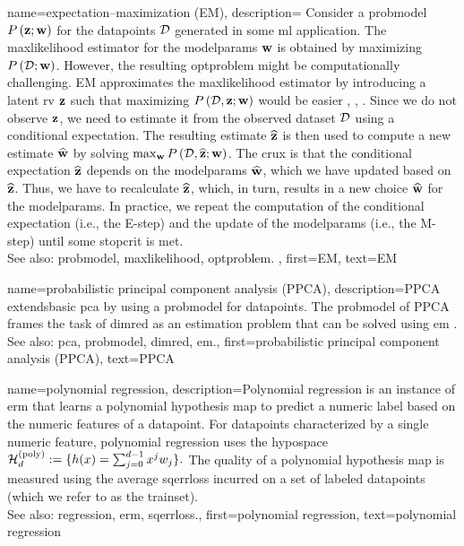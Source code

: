 {name={expectation–maximization (EM)}, 
	description={ 
		Consider a \gls{probmodel} $P\left({\bf z}; {\bf w}\right)$ for the \glspl{datapoint} $\mathcal{D}$ generated in some 
		\gls{ml} application. The \gls{maxlikelihood} estimator for the \gls{modelparams} ${\bf w}$ is obtained by maximizing 
		$P\left(\mathcal{D}; {\bf w}\right)$. However, the resulting \gls{optproblem} might be computationally 
		challenging. EM approximates the \gls{maxlikelihood} estimator by introducing a latent 
		\gls{rv} ${\bf z}$ such that maximizing $P\left(\mathcal{D},{\bf z}; {\bf w}\right)$ would be easier 
		\cite{hastie01statisticallearning}, \cite{BishopBook}, \cite{GraphModExpFamVarInfWainJor}. Since we 
		do not observe ${\bf z}$, we need to estimate it from the observed \gls{dataset} $\mathcal{D}$ 
		using a conditional \gls{expectation}. The resulting estimate $\widehat{{\bf z}}$ is then used to 
		compute a new estimate $\widehat{{\bf w}}$ by solving $\max_{{\bf w}} P\left(\mathcal{D}, \widehat{{\bf z}}; {\bf w}\right)$. 
		The crux is that the conditional \gls{expectation} $\widehat{{\bf z}}$ depends on the \gls{modelparams} $\widehat{{\bf w}}$, 
		which we have updated based on $\widehat{{\bf z}}$. Thus, we have to recalculate $\widehat{{\bf z}}$, 
		which, in turn, results in a new choice $\widehat{{\bf w}}$ for the \gls{modelparams}. In practice, 
		we repeat the computation of the conditional \gls{expectation} (i.e., the E-step) and the update 
		of the \gls{modelparams} (i.e., the M-step) until some \gls{stopcrit} is met. 
				\\
		See also: \gls{probmodel}, \gls{maxlikelihood}, \gls{optproblem}. },
	first={EM},
	text={EM}
}


{name={probabilistic principal component analysis (PPCA)}, 
	description={PPCA 
		extends\linebreak basic \gls{pca} by using a \gls{probmodel} for \glspl{datapoint}. 
		The \gls{probmodel} of PPCA frames the task of \gls{dimred} 
		as an estimation problem that can be solved using \gls{em} \cite{TippingProbPCA}.
				\\
		See also: \gls{pca}, \gls{probmodel}, \gls{dimred}, \gls{em}.},
	first={probabilistic principal component analysis (PPCA)},
	text={PPCA}
}
	
{name={polynomial regression}, 
	description={Polynomial 
		\gls{regression} is an instance of \gls{erm} that learns a polynomial \gls{hypothesis} 
		\gls{map} to predict a numeric \gls{label} based on the numeric \glspl{feature} of a \gls{datapoint}. 
		 For \glspl{datapoint} characterized by a single numeric \gls{feature}, polynomial \gls{regression} uses the \gls{hypospace} 
		$\mathcal{H}^{(\rm poly)}_{d} := \{ h(x) = \sum_{j=0}^{d-1} x^{j} w_{j} \}.$
		The quality of a polynomial \gls{hypothesis} \gls{map} is measured using the average \gls{sqerrloss} 
		incurred on a set of \glspl{labeled datapoint} (which we refer to as the \gls{trainset}).
					\\
		See also: \gls{regression}, \gls{erm}, \gls{sqerrloss}.},
	first={polynomial regression},
	text={polynomial regression}
}

